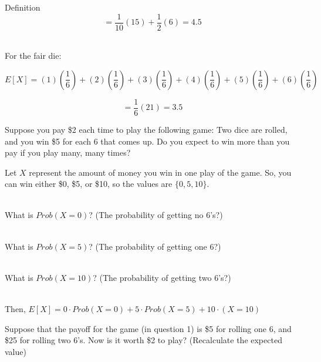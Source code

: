 {\begin{intro}{Definition}
            $$ = \frac{1}{10}(15) + \frac{1}{2}(6) = 4.5$$

            ~\\
            For the fair die:

            $$E[X] = (1)(\frac{1}{6}) + (2)(\frac{1}{6}) + (3)(\frac{1}{6})
                    + (4)(\frac{1}{6}) + (5)(\frac{1}{6}) + (6)(\frac{1}{6})$$

            $$ = \frac{1}{6}(21) = 3.5$$
        \end{intro}

    \newpage

    \begin{questionNOGRADE}{\thequestion}
        Suppose you pay \$2 each time to play the following game: Two
        dice are rolled, and you win \$5 for each 6 that comes up.
        Do you expect to win more than you pay if you play many, many times?

        Let $X$ represent the amount of money you win in one play
        of the game. So, you can win either \$0, \$5, or \$10, so the
        values are $\{0, 5, 10\}$.

        ~\\ What is $Prob(X = 0)$? (The probability of getting no 6's?)
        ~\\ \vspace{2cm}

        ~\\ What is $Prob(X = 5)$? (The probability of getting one 6?)
        ~\\ \vspace{2cm}

        ~\\ What is $Prob(X = 10)$? (The probability of getting two 6's?)
        ~\\ \vspace{2cm}

        ~\\ Then, $E[X] = 0 \cdot Prob(X = 0) + 5 \cdot Prob(X = 5) + 10 \cdot (X = 10)$
        ~\\ \vspace{3cm}
    \end{questionNOGRADE}

    \newpage

    \begin{questionNOGRADE}{\thequestion}
        Suppose that the payoff for the game (in question 1) is \$5
        for rolling one 6, and \$25 for rolling two 6's. Now is it worth \$2 to play?
        (Recalculate the expected value)
    \end{questionNOGRADE}

}
